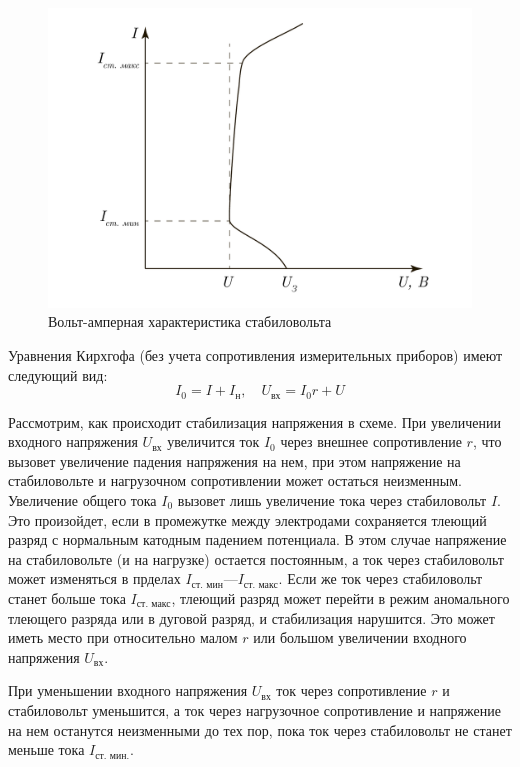 \documentclass[a4paper, 12pt]{article}
\begin{document}
	\begin{figure}[h]
		\centering
		\includegraphics[scale=0.4]{Graph10.pdf}
		\caption{Вольт-амперная характеристика стабиловольта}
		\label{fig:Graph10}
	\end{figure}
	Уравнения Кирхгофа (без учета сопротивления измерительных приборов) имеют следующий вид:
	\begin{equation}
		I_0=I+I_\text{н},\quad
		U_\text{вх}=I_0r+U
	\end{equation}
	\par
	Рассмотрим, как происходит стабилизация напряжения в схеме. При увеличении входного напряжения $U_\text{вх}$ увеличится ток $I_0$ через внешнее сопротивление $r$, что вызовет увеличение падения напряжения на нем, при этом напряжение на стабиловольте и нагрузочном сопротивлении может остаться неизменным. Увеличение общего тока $I_0$ вызовет лишь увеличение тока через стабиловольт $I$. Это произойдет, если в промежутке между электродами сохраняется тлеющий разряд с нормальным катодным падением потенциала. В этом случае напряжение на стабиловольте (и на нагрузке) остается постоянным, а ток через стабиловольт может изменяться в прделах $I_\text{ст. мин}$—$I_\text{ст. макс}$. Если же ток через стабиловольт станет больше тока $I_\text{ст. макс}$, тлеющий разряд может перейти в режим аномального тлеющего разряда или в дуговой разряд, и стабилизация нарушится. Это может иметь место при относительно малом $r$ или большом увеличении входного напряжения $U_\text{вх}$.\par
	При уменьшении входного напряжения $U_\text{вх}$ ток через сопротивление $r$ и стабиловольт уменьшится, а ток через нагрузочное сопротивление и напряжение на нем останутся неизменными до тех пор, пока ток через стабиловольт не станет меньше тока $I_\text{ст. мин.}$.\par
\end{document}
